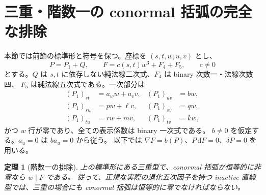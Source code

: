 \documentclass[11pt,a4paper]{ltjsarticle}
\newtheorem{theorem}{定理}[section]
\theoremstyle{remark}\newtheorem{remark}[theorem]{注意}
\begin{document}
\section{三重・階数一の conormal 括弧の完全な排除}
\label{sec:v19-rank1}

本節では前節の標準形と符号を保つ。座標を $(s,t,w,u,v)$ とし、
\[
 P=P_1+Q,\qquad F=c(s,t)w^3+F_4+F_5,\qquad c\ne0
\]
とする。$Q$ は $s,t$ に依存しない純法線二次式、$F_4$ は binary 次数一・法線次数四、
$F_5$ は純法線五次式である。一次部分は
\begin{align*}
 (P_1)_{st}&=a_w w+a_v v,&(P_1)_{uv}&=b w,\\
 (P_1)_{su}&=p w+\ell v,&(P_1)_{sv}&=q w,\\
 (P_1)_{tu}&=r w+m v,&(P_1)_{tv}&=k w,
\end{align*}
かつ $w$ 行が零であり、全ての表示係数は binary 一次式である。
$b\ne0$ を仮定する。$a_u=0$ は $ba_u=0$ から従う。
以下では $\nabla F=b(P)$、$P\,\mathrm dF=0$、$\delta P=0$ を用いる。

\begin{theorem}[階数一の排除]\label{thm:v19-rank1-exclusion}
上の標準形にある三重型で、conormal 括弧が恒等的に非零なら $w\mid F$ である。
従って、正規な実際の退化五次因子を持つ inactive 直線型では、三重の場合にも
conormal 括弧は恒等的に零でなければならない。
\end{theorem}
\end{document}

